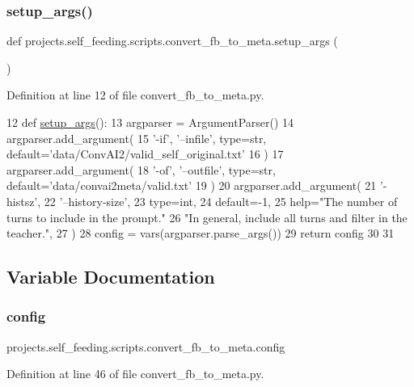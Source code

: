 \subsubsection{\texorpdfstring{setup\+\_\+args()}{setup\_args()}}
{\footnotesize\ttfamily def projects.\+self\+\_\+feeding.\+scripts.\+convert\+\_\+fb\+\_\+to\+\_\+meta.\+setup\+\_\+args (\begin{DoxyParamCaption}{ }\end{DoxyParamCaption})}



Definition at line 12 of file convert\+\_\+fb\+\_\+to\+\_\+meta.\+py.


\begin{DoxyCode}
12 \textcolor{keyword}{def }\hyperlink{namespaceprojects_1_1self__feeding_1_1scripts_1_1convert__fb__to__meta_a4e7b9af677e57ec059b5011985d1ad87}{setup\_args}():
13     argparser = ArgumentParser()
14     argparser.add\_argument(
15         \textcolor{stringliteral}{'-if'}, \textcolor{stringliteral}{'--infile'}, type=str, default=\textcolor{stringliteral}{'data/ConvAI2/valid\_self\_original.txt'}
16     )
17     argparser.add\_argument(
18         \textcolor{stringliteral}{'-of'}, \textcolor{stringliteral}{'--outfile'}, type=str, default=\textcolor{stringliteral}{'data/convai2meta/valid.txt'}
19     )
20     argparser.add\_argument(
21         \textcolor{stringliteral}{'-histsz'},
22         \textcolor{stringliteral}{'--history-size'},
23         type=int,
24         default=-1,
25         help=\textcolor{stringliteral}{"The number of turns to include in the prompt."}
26         \textcolor{stringliteral}{"In general, include all turns and filter in the teacher."},
27     )
28     config = vars(argparser.parse\_args())
29     \textcolor{keywordflow}{return} config
30 
31 
\end{DoxyCode}


\subsection{Variable Documentation}
\mbox{\label{namespaceprojects_1_1self__feeding_1_1scripts_1_1convert__fb__to__meta_a924802bd0174014857610ec9a1485900}} 
\subsubsection{\texorpdfstring{config}{config}}
{\footnotesize\ttfamily projects.\+self\+\_\+feeding.\+scripts.\+convert\+\_\+fb\+\_\+to\+\_\+meta.\+config}



Definition at line 46 of file convert\+\_\+fb\+\_\+to\+\_\+meta.\+py.


